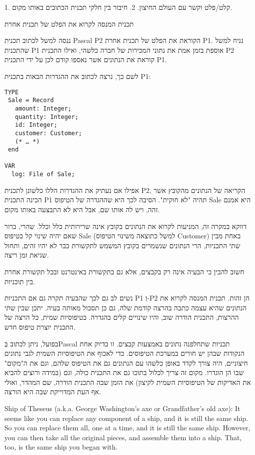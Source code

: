       1. קלט/פלט וקשר עם העולם החיצון.
      2. חיבור בין חלקי תכנית הכתובים באותו מקום.

      תכנית המנסה לקרוא את הפלט של תכנית אחרת

      ננסה למשל לכתוב תכנית Pascal P2 הקוראת את הפלט של תכנית אחרת P1. נניח למשל שהתכנית P1 אוספת בזמן אמת את נתוני המכירות של חברה כלשהי, ואילו התכנית P2 קוראת את הנתונים אשר נאספו קודם לכן על ידי התכנית P1.

      לשם כך, נרצה לכתוב את ההגדרות הבאות בתכנית P1:

\begin{verbatim}
TYPE
 Sale = Record
   amount: Integer;
   quantity: Integer;
   id: Integer;
   customer: Customer;
   (* … *)
 end

VAR
  log: File of Sale;
\end{verbatim}

      אפילו אם נעתיק את ההגדרות הללו כלשונן לתכנית P2, הקריאה של הנתונים מהקובץ אשר
      הכינה התכנית P1 תהיה "לא חוקית". הסיבה לכך היא שההגדרה של הטיפוס Sale היא אמנם
      זהה, ויש לה אותו שם, אבל היא לא התבצעה באותו מקום.

      דווקא במקרה זה, המניעות לקרוא את הנתונים בקובץ אינה שרירותית כלל וכלל. שהרי,
      ברור שאם יהיה שינוי קל בטיפוס Sale (למשל כתוצאה משינוי הטיפוס Customer) באחת
      מבין שתי התכניות, הרי הנתונים שנשמרים בקובץ המשמש לתקשורת כבר לא יהיו זהים,
      ותחול שגיאת זמן ריצה.

      חשוב להבין כי הבעיה אינה רק בקבצים, אלא גם בתקשורת באינטרנט ובכל תקשורת אחרת
      בין תוכניות.

      נשים לב גם לכך שהבעיה תקרה גם אם התכניות P1 וְ-P2 הן זהות. תכנית המנסה לקרוא את הנתונים שהיא עצמה כתבה בהרצה קודמת שלה, גם כן תסבול מאותה בעיה. יתכן שבין שתי ההרצות, התכנית הודרה שוב, והיו שינויים קלים בהגדרה. בטיפוסיות שמית, כל הרצה של התכנית יוצרת טיפוס חדש.

      בפועל, ניתן לכתוב בְּPascal תכניות שתחלפנה נתונים באמצעות קבצים. זו בדיוק אחת
      הנקודות שבהן יש חורים במערכת הטיפוסים. כדי לאכוף את הטיפוסיות השמית לגבי נתונים
      חיצוניים, היה צורך לקדד באופן כלשהו עם הנתונים גם את הטיפוס שלהם, וגם את
      ה"מקום" שבו הן הוגדרו. מקום זה צריך לכלול בתוכו גם את התכנית כולה, וגם (במידה
      ורוצים להביא את האדיקות של הטיפוסיות השמית לקיצון) את הזמן שבה התכנית הודרה, שם
      המהדר, ואולי אף העת המדוייקת שבה היא הורצה.

      Ship of Theseus (a.k.a. George Washington's axe or Grandfather's old axe): It
      seems like you can replace any component of a ship, and it is still the same
      ship. So you can replace them all, one at a time, and it is still the same
      ship. However, you can then take all the original pieces, and assemble them
      into a ship. That, too, is the same ship you began with.

